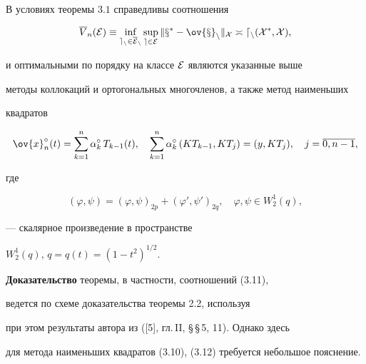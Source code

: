 \begin{thms}


В условиях теоремы $3.1$ справедливы соотношения


\begin{equation}


\overline{V}_n(\cal E)\equiv \inf_{e_n\in \overline{


\cal E}_n}\sup_{e\in \cal E}\| x^* -\ov{x}_n\|_X 


\asymp d_n(X^*,X),


\end{equation}


и оптимальными по порядку на классе $\cal E$ являются указанные выше


методы коллокаций и ортогональных многочленов, а также метод наименьших


квадратов


\begin{equation}


\ov{x}_n^\circ (t)=\sum_{k=1}^n\alpha_k^\circ\, T_{k-1}(t),\quad


\sum_{k=1}^n\alpha_k^\circ\, (KT_{k-1},KT_j)=(y,KT_j),\quad


j=\overline{0,n-1},


\end{equation}


где


\begin{equation}


(\varphi ,\psi)=(\varphi ,\psi)_{2p}+(\varphi' ,\psi')_{2q},\quad


\varphi ,\psi\in W_2^1(q),


\end{equation}


--- скалярное произведение в пространстве


$W_2^1(q)$, $q=q(t)=(1-t^2)^{1/2}$.


\end{thms}





{\bf Доказательство} теоремы, в частности, соотношений (3.11),


ведется по схеме доказательства теоремы 2.2, используя


при этом результаты автора из ([5], гл.\,II, \S\,\S\,5, 11). Однако здесь


для метода наименьших квадратов (3.10), (3.12) требуется небольшое пояснение.





